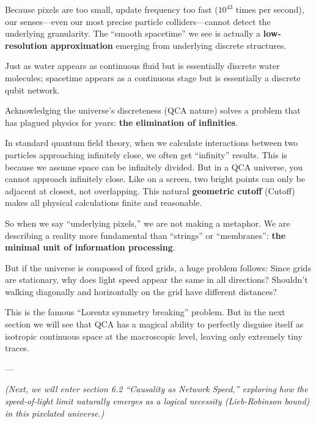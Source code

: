 Because pixels are too small, update frequency too fast ($10^{43}$ times per second), our senses---even our most precise particle colliders---cannot detect the underlying granularity. The ``smooth spacetime'' we see is actually a \textbf{low-resolution approximation} emerging from underlying discrete structures.

Just as water appears as continuous fluid but is essentially discrete water molecules; spacetime appears as a continuous stage but is essentially a discrete qubit network.

Acknowledging the universe's discreteness (QCA nature) solves a problem that has plagued physics for years: \textbf{the elimination of infinities}.

In standard quantum field theory, when we calculate interactions between two particles approaching infinitely close, we often get ``infinity'' results. This is because we assume space can be infinitely divided. But in a QCA universe, you cannot approach infinitely close. Like on a screen, two bright points can only be adjacent at closest, not overlapping. This natural \textbf{geometric cutoff} (Cutoff) makes all physical calculations finite and reasonable.

So when we say ``underlying pixels,'' we are not making a metaphor. We are describing a reality more fundamental than ``strings'' or ``membranes'': \textbf{the minimal unit of information processing}.

But if the universe is composed of fixed grids, a huge problem follows: Since grids are stationary, why does light speed appear the same in all directions? Shouldn't walking diagonally and horizontally on the grid have different distances?

This is the famous ``Lorentz symmetry breaking'' problem. But in the next section we will see that QCA has a magical ability to perfectly disguise itself as isotropic continuous space at the macroscopic level, leaving only extremely tiny traces.

---

\textit{(Next, we will enter section 6.2 ``Causality as Network Speed,'' exploring how the speed-of-light limit naturally emerges as a logical necessity (Lieb-Robinson bound) in this pixelated universe.)}

